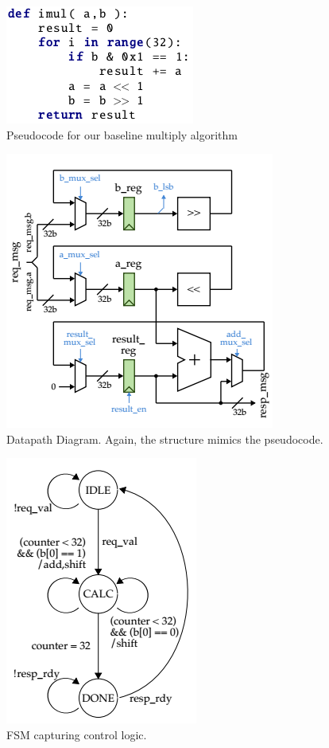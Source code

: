 \documentclass[11pt]{article}
\begin{document}
\begin{figure}[b]
\centering
\includegraphics[scale=0.9]{imul}
\caption{Pseudocode for our baseline multiply algorithm}
\label{fig:code}
\end{figure}

\begin{figure}[b]
\centering
\includegraphics[scale=0.6]{Datapath}
\caption{Datapath Diagram. Again, the structure mimics the pseudocode.}
\label{fig:datapath}
\end{figure}

\begin{figure}[b]
\centering
\includegraphics[scale=0.6]{BaseFSM}
\caption{FSM capturing control logic.}
\label{fig:BaseFSM}
\end{figure}
\end{document}
